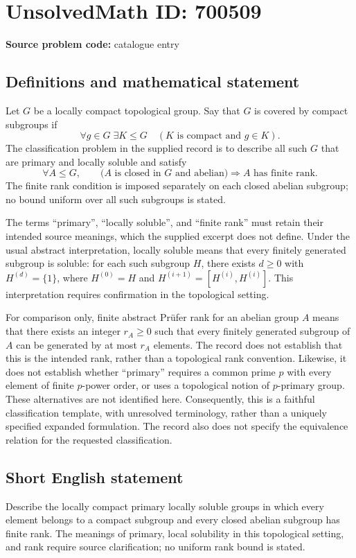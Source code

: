 \documentclass[11pt]{article}
\begin{document}
\section*{UnsolvedMath ID: 700509}
\textbf{Source problem code:} catalogue entry
\subsection{Definitions and mathematical statement}
Let \(G\) be a locally compact topological group. Say that \(G\) is covered by compact subgroups if
\[
\forall g\in G\;\exists K\leq G\quad(K\text{ is compact and }g\in K).
\]
The classification problem in the supplied record is to describe all such \(G\) that are primary and locally soluble and satisfy
\[
\forall A\leq G,\qquad
\bigl(A\text{ is closed in }G\text{ and abelian}\bigr)
\Longrightarrow A\text{ has finite rank}.
\]
The finite rank condition is imposed separately on each closed abelian subgroup; no bound uniform over all such subgroups is stated.

The terms ``primary'', ``locally soluble'', and ``finite rank'' must retain their intended source meanings, which the supplied excerpt does not define. Under the usual abstract interpretation, locally soluble means that every finitely generated subgroup is soluble: for each such subgroup \(H\), there exists \(d\geq0\) with \(H^{(d)}=\{1\}\), where \(H^{(0)}=H\) and \(H^{(i+1)}=[H^{(i)},H^{(i)}]\). This interpretation requires confirmation in the topological setting.

For comparison only, finite abstract Pr\"ufer rank for an abelian group \(A\) means that there exists an integer \(r_A\geq0\) such that every finitely generated subgroup of \(A\) can be generated by at most \(r_A\) elements. The record does not establish that this is the intended rank, rather than a topological rank convention. Likewise, it does not establish whether ``primary'' requires a common prime \(p\) with every element of finite \(p\)-power order, or uses a topological notion of \(p\)-primary group. These alternatives are not identified here. Consequently, this is a faithful classification template, with unresolved terminology, rather than a uniquely specified expanded formulation. The record also does not specify the equivalence relation for the requested classification.
\subsection{Short English statement}
Describe the locally compact primary locally soluble groups in which every element belongs to a compact subgroup and every closed abelian subgroup has finite rank. The meanings of primary, local solubility in this topological setting, and rank require source clarification; no uniform rank bound is stated.
\end{document}
